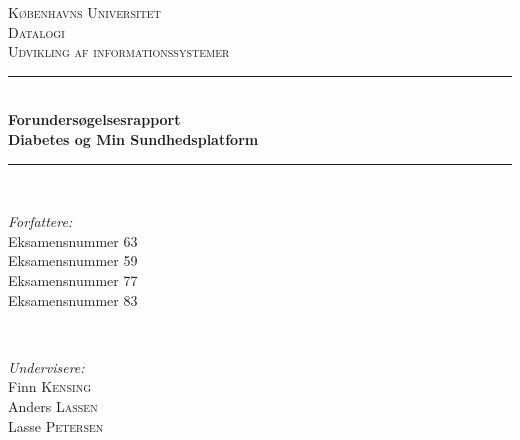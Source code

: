 \documentclass[12pt]{article}                                                        %
\begin{document}
	
	\begin{titlepage}
		
		\newcommand{\HRule}{\rule{\linewidth}{0.5mm}} %
		
		\center %
		
		
		\textsc{\Large Københavns Universitet}\\[1.5cm] %
		\textsc{\large Datalogi}\\[0.5cm] %
		\textsc{\normalsize Udvikling af informationssystemer}\\[0.5cm] %
		
		
		\HRule \\[0.4cm]
		{ \LARGE \bfseries Forundersøgelsesrapport\\Diabetes og Min Sundhedsplatform}\\[0.4cm] %
		\HRule \\[1.5cm]
		
		
		\begin{minipage}{0.4\textwidth}
			\begin{flushleft} \normalsize
				\emph{Forfattere:}\\ 
				Eksamensnummer 63\\
				Eksamensnummer 59\\
				Eksamensnummer 77\\
				Eksamensnummer 83\\
			\end{flushleft}
		\end{minipage}
		~
		\begin{minipage}{0.4\textwidth}
			\begin{flushright} \normalsize
				\emph{Undervisere:} \\
				Finn \textsc{Kensing}\\ %
				Anders \textsc{Lassen}\\
				Lasse \textsc{Petersen}\\
				\hfill \\
			\end{flushright}
		\end{minipage}\\[2cm]
		

\end{titlepage}
\end{document}
